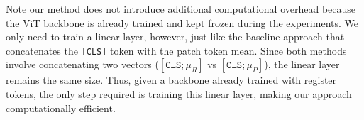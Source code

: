 





Note our method does not introduce additional computational overhead because the ViT backbone is already trained and kept frozen during the experiments. We only need to train a linear layer, however, just like the baseline approach that concatenates the \texttt{[CLS]} token with the patch token mean. Since both methods involve concatenating two vectors ($[\texttt{CLS}; \mu_R]$ vs $[\texttt{CLS}; \mu_P]$), the linear layer remains the same size. Thus, given a backbone already trained with register tokens, the only step required is training this linear layer, making our approach computationally efficient.